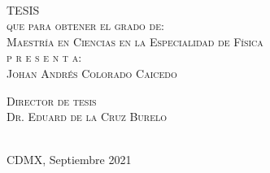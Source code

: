 \begin{titlepage}
\begin{minipage}[c][0.81\textheight][t]{0.75\textwidth}
\begin{center}
      {\color{black}{\large\scshape Medición de la masa del Leptón tau en estados finales semi-invisibles en topología 1x1 en la colaboración Belle II}}\\[.2in]

      \vspace{1cm}            

      \textsc{\LARGE T\hspace{0.5cm}E\hspace{0.5cm}S\hspace{0.5cm}I\hspace{0.5cm}S}\\[1.5cm]
      \textsc{\large que para obtener el grado de:}\\[0.5cm]
      \textsc{\large Maestría en Ciencias en la Especialidad de Física}\\[0.5cm]
      
      {\color{black}\textsc{\large p r e s e n t a:}}\\[0.5cm]
      \textsc{\large {Johan Andrés Colorado Caicedo}}\\[1cm]          

      \vspace{0.5cm}

      {\large\scshape 
        {\color{black}Director de tesis}\\[0.3cm] {Dr. Eduard de la Cruz Burelo \\ 
          }}\\[.2in]

      \vspace{0.5cm}
       
      \large{CDMX, Septiembre 2021}
    \end{center}
  \end{minipage}
\end{titlepage}
